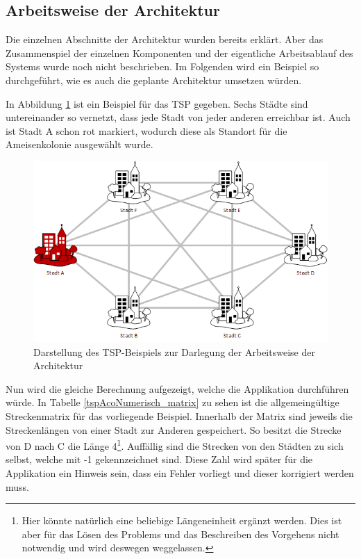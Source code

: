 \subsection{Arbeitsweise der Architektur}
\label{numerschiesBeispiel}
	Die einzelnen Abschnitte der Architektur wurden bereits erklärt. Aber das Zusammenspiel der einzelnen Komponenten und der eigentliche Arbeitsablauf des Systems wurde noch nicht beschrieben. Im Folgenden wird ein Beispiel so durchgeführt, wie es auch die geplante Architektur umsetzen würden.
		
	In Abbildung \ref{tspAcoNumerisch} ist ein Beispiel für das \ac{TSP} gegeben. Sechs Städte sind untereinander so vernetzt, dass jede Stadt von jeder anderen erreichbar ist. Auch ist Stadt A schon rot markiert, wodurch diese als Standort für die Ameisenkolonie ausgewählt wurde. 
	
	\begin{figure}[h]
		\centering
		\includegraphics[width=0.9\linewidth]{images/TSP_ACO_numerisch.png}
		\caption{Darstellung des \ac{TSP}-Beispiels zur Darlegung der Arbeitsweise der Architektur}
		\label{tspAcoNumerisch}
	\end{figure}

	Nun wird die gleiche Berechnung aufgezeigt, welche die Applikation durchführen würde. In Tabelle \ref{tspAcoNumerisch_matrix} zu sehen ist die allgemeingültige Streckenmatrix für das vorliegende Beispiel. Innerhalb der Matrix sind jeweils die Streckenlängen von einer Stadt zur Anderen gespeichert. So besitzt die Strecke von D nach C die Länge 4\footnote{Hier könnte natürlich eine beliebige Längeneinheit ergänzt werden. Dies ist aber für das Lösen des Problems und das Beschreiben des Vorgehens nicht notwendig und wird deswegen weggelassen.}. Auffällig sind die Strecken von den Städten zu sich selbst, welche mit -1 gekennzeichnet sind. Diese Zahl wird später für die Applikation ein Hinweis sein, dass ein Fehler vorliegt und dieser korrigiert werden muss.
	
